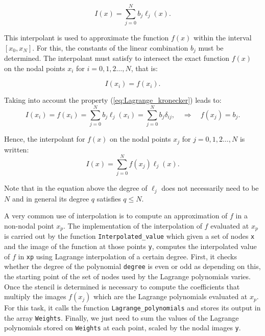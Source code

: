      \begin{equation}
     	I(x) = \sum_{j=0}^{N}   b_j\ell_j (x).
     \end{equation}
    
    This interpolant is used to approximate the function $f(x)$ within the interval $[x_0,x_N]$. For this, the constants of the linear combination $b_j$ must be determined. The interpolant must satisfy to intersect the exact function $f(x)$ on the nodal points $x_i$ for $i=0,1,2\ldots,N$, that is:
    
    \begin{equation}
    	I(x_i) = f(x_i).
    \end{equation}
    
    Taking into account the property (\ref{eq:Lagrange_kronecker}) leads to:
    \begin{equation}
    I(x_i) = f(x_i) = \sum_{j=0}^{N}   b_j\ell_j (x_i) =\sum_{j=0}^{N}   b_j \delta_{ij}, \quad \Rightarrow \quad f(x_j) = b_j.
    \end{equation}
    
    Hence, the interpolant for $f(x)$ on the nodal points $x_j$ for $j=0,1,2\ldots,N$ is written:
    \begin{equation}
    I(x) = \sum_{j=0}^{N}  f(x_j) \ell_j (x).
    \end{equation}
    
    Note that in the equation above the degree of $\ell_j$ does not necessarily need to be $N$ and in general its degree $q$ satisfies $q\leq N$.
    
    A very common use of interpolation is to compute an approximation of $f$ in a non-nodal point $x_p$. The implementation of the interpolation of $f$ evaluated at $x_p$ is carried out by the function \verb|Interpolated_value| which given a set of nodes \verb|x| and the image of the function at those points \verb|y|, computes the interpolated value of $f$ in
    \verb|xp| using Lagrange interpolation of a certain degree. First, it checks whether the degree of the polynomial \verb|degree| is even or odd as depending on this, the starting point of the set of nodes used by the Lagrange polynomials varies. Once the stencil is determined is necessary to compute the coefficients that multiply the images $f(x_j)$ which are the Lagrange polynomials evaluated at $x_p$. For this task, it calls the function \verb|Lagrange_polynomials| and stores its output in the array \verb|Weights|. Finally, we just need to sum the values of the Lagrange polynomials stored on \verb|Weights| at each point, scaled by the nodal images \verb|y|.
    
